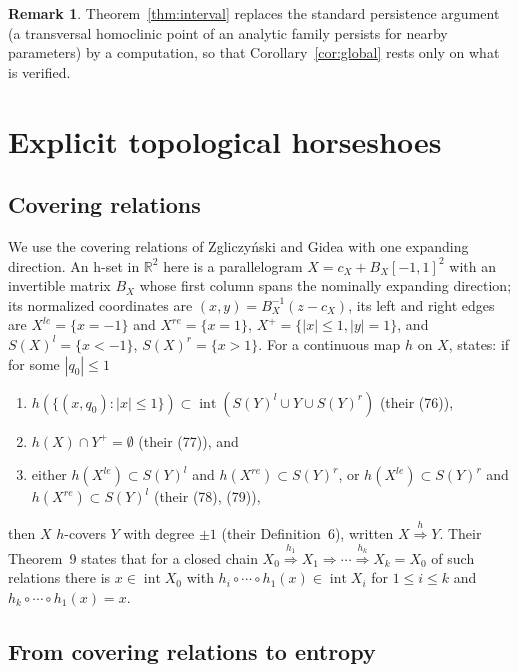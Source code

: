 \documentclass[11pt]{article}
\theoremstyle{definition}
\newtheorem{remark}{Remark}
\newcommand{\R}{\mathbb{R}}
\begin{document}
\begin{remark}
Theorem~\ref{thm:interval} replaces the standard persistence argument (a transversal homoclinic point of an analytic family persists for nearby parameters) by a computation, so that Corollary~\ref{cor:global} rests only on what is verified.
\end{remark}

\section{Explicit topological horseshoes}\label{sec:hs}

\subsection{Covering relations}

We use the covering relations of Zgliczy\'nski and Gidea \cite{zg2004} with one expanding direction. An h-set in $\R^2$ here is a parallelogram $X = c_X + B_X[-1, 1]^2$ with an invertible matrix $B_X$ whose first column spans the nominally expanding direction; its normalized coordinates are $(x, y) = B_X^{-1}(z - c_X)$, its left and right edges are $X^{le} = \{x = -1\}$ and $X^{re} = \{x = 1\}$, $X^+ = \{|x| \le 1, |y| = 1\}$, and $S(X)^l = \{x < -1\}$, $S(X)^r = \{x > 1\}$. For a continuous map $h$ on $X$, \cite[Thm.~16]{zg2004} states: if for some $|q_0| \le 1$
\begin{enumerate}
\item[(i)] $h(\{(x, q_0) : |x| \le 1\}) \subset \operatorname{int}(S(Y)^l \cup Y \cup S(Y)^r)$ (their (76)),
\item[(ii)] $h(X) \cap Y^+ = \emptyset$ (their (77)), and
\item[(iii)] either $h(X^{le}) \subset S(Y)^l$ and $h(X^{re}) \subset S(Y)^r$, or $h(X^{le}) \subset S(Y)^r$ and $h(X^{re}) \subset S(Y)^l$ (their (78), (79)),
\end{enumerate}
then $X$ $h$-covers $Y$ with degree $\pm1$ (their Definition~6), written $X \overset{h}{\Longrightarrow} Y$. Their Theorem~9 states that for a closed chain $X_0 \overset{h_1}{\Longrightarrow} X_1 \Rightarrow \cdots \overset{h_k}{\Longrightarrow} X_k = X_0$ of such relations there is $x \in \operatorname{int}X_0$ with $h_i \circ \cdots \circ h_1(x) \in \operatorname{int}X_i$ for $1 \le i \le k$ and $h_k \circ \cdots \circ h_1(x) = x$.

\subsection{From covering relations to entropy}
\end{document}
